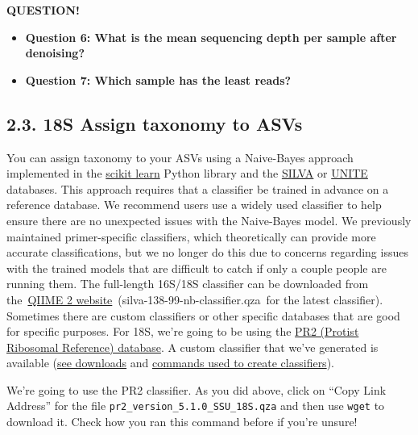 \documentclass[
]{book}
\providecommand{\tightlist}{%
  \setlength{\itemsep}{0pt}\setlength{\parskip}{0pt}}
\newenvironment{bluebox}{
  \definecolor{shadecolor}{RGB}{172, 210, 237}
  \color{white}
  \begin{shaded}}
 {\end{shaded}}
\begin{document}
\begin{bluebox}

\begin{center}
\textbf{QUESTION!}

\end{center}

\begin{itemize}
\tightlist
\item
  \textbf{Question 6: What is the mean sequencing depth per sample after denoising?}
\item
  \textbf{Question 7: Which sample has the least reads?}
\end{itemize}

\end{bluebox}

\subsection{2.3. 18S Assign taxonomy to ASVs}\label{s-assign-taxonomy-to-asvs-1}

You can assign taxonomy to your ASVs using a Naive-Bayes approach implemented in the \href{http://scikit-learn.org/stable/}{scikit learn} Python library and the \href{https://www.arb-silva.de/}{SILVA} or \href{https://unite.ut.ee/}{UNITE} databases. This approach requires that a classifier be trained in advance on a reference database. We recommend users use a widely used classifier to help ensure there are no unexpected issues with the Naive-Bayes model. We previously maintained primer-specific classifiers, which theoretically can provide more accurate classifications, but we no longer do this due to concerns regarding issues with the trained models that are difficult to catch if only a couple people are running them. The full-length 16S/18S classifier can be downloaded from the~\href{https://docs.qiime2.org/2022.11/data-resources/}{QIIME 2 website}~(silva-138-99-nb-classifier.qza~for the latest classifier). Sometimes there are custom classifiers or other specific databases that are good for specific purposes. For 18S, we're going to be using the \href{https://pr2-database.org/}{PR2 (Protist Ribosomal Reference) database}. A custom classifier that we've generated is available (\href{http://kronos.pharmacology.dal.ca/public_files/MH/taxa_classifiers/scikit-learn_v1.4.2_classifiers/}{see downloads} and \href{https://github.com/LangilleLab/microbiome_helper/wiki/Creating-QIIME-2-Taxonomic-Classifiers}{commands used to create classifiers}).

We're going to use the PR2 classifier. As you did above, click on ``Copy Link Address'' for the file \texttt{pr2\_version\_5.1.0\_SSU\_18S.qza} and then use \texttt{wget} to download it. Check how you ran this command before if you're unsure!
\end{document}
